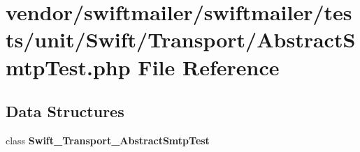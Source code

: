 \section{vendor/swiftmailer/swiftmailer/tests/unit/\+Swift/\+Transport/\+Abstract\+Smtp\+Test.php File Reference}
\label{_abstract_smtp_test_8php}
\subsection*{Data Structures}
\begin{DoxyCompactItemize}
\item 
class {\bf Swift\+\_\+\+Transport\+\_\+\+Abstract\+Smtp\+Test}
\end{DoxyCompactItemize}
